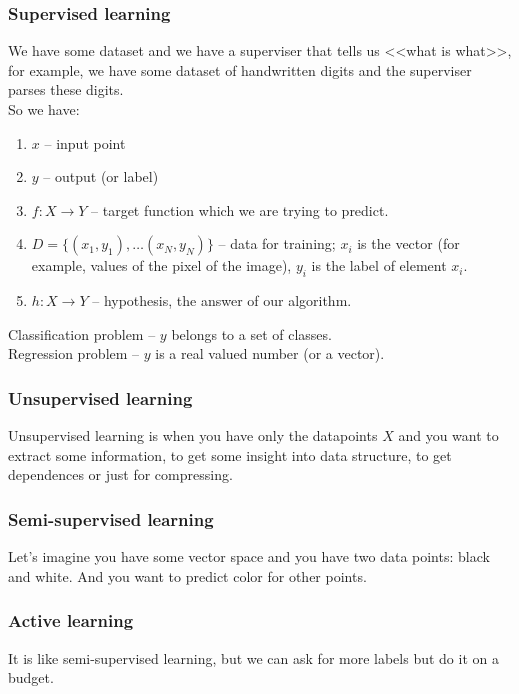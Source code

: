 \subsubsection*{Supervised learning}

We have some dataset and we have a superviser that tells us <<what is what>>, for example, we have some dataset of handwritten digits and the superviser parses these digits. \\
So we have:
\begin{enumerate}[label=$\bullet$]
	\item $x$ -- input point
	\item $y$ -- output (or label)
	\item $f\colon X\to Y$ -- target function which we are trying to predict.
	\item $D=\{(x_1,y_1),\ldots(x_N,y_N)\}$ -- data for training; $x_i$ is the vector (for example, values of the pixel of the image), $y_i$ is the label of element $x_i$.
	\item $h\colon X\to Y$ -- hypothesis, the answer of our algorithm.
\end{enumerate}
Classification problem -- $y$ belongs to a set of classes.\\
Regression problem -- $y$ is a real valued number (or a vector).

\subsubsection*{Unsupervised learning}

Unsupervised learning is when you have only the datapoints $X$ and you want to extract some information, to get some insight into data structure, to get dependences or just for compressing. 

\subsubsection*{Semi-supervised learning}

Let's imagine you have some vector space and you have two data points: black and white. And you want to predict color for other points.

\subsubsection*{Active learning}

It is like semi-supervised learning, but we can ask for more labels but do it on a budget.

